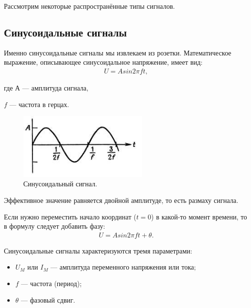 	Рассмотрим некоторые распространённые типы сигналов.
\subsection{Синусоидальные сигналы}
	Именно синусоидальные сигналы мы извлекаем из розетки. Математическое выражение, описывающее синусоидальное напряжение, имеет вид:
	\begin{gather}
	U=A sin2 \pi ft,
	\end{gather}
	
	где А --- амплитуда сигнала,
	
	$f$ --- частота в герцах.

	\begin{figure}[H]
    \centering
    \includegraphics[width=0.575\textwidth]{../image/s_sin.png}
    \caption{Синусоидальный сигнал.}
	\end{figure}
	Эффективное значение равняется двойной амплитуде, то есть размаху сигнала. 

	Если нужно переместить начало координат ($t=0$) в какой-то момент времени, то в формулу следует добавить фазу:
	\begin{gather}
	U=A sin2 \pi ft + \theta.
	\end{gather}
	
	Синусоидальные сигналы характеризуются тремя параметрами:
	\begin{itemize}
		\item $U_{M}$ или $I_{M}$ --- амплитуда переменного напряжения или тока;
		\item $f$ --- частота (период);
		\item $\theta$ --- фазовый сдвиг.
	\end{itemize}

	
	
